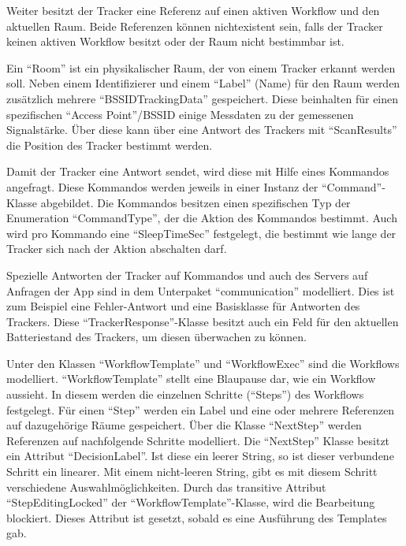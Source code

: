 Weiter besitzt der Tracker eine Referenz auf einen aktiven Workflow und den aktuellen Raum.
Beide Referenzen können nichtexistent sein, falls der Tracker keinen aktiven Workflow besitzt oder der Raum nicht bestimmbar ist.

Ein \enquote{Room} ist ein physikalischer Raum, der von einem Tracker erkannt werden soll.
Neben einem Identifizierer und einem \enquote{Label} (Name) für den Raum werden zusätzlich mehrere \enquote{BSSIDTrackingData} gespeichert.
Diese beinhalten für einen spezifischen \enquote{Access Point}/\gls{BSSID} einige Messdaten zu der gemessenen Signalstärke.
Über diese kann über eine Antwort des Trackers mit \enquote{ScanResults} die Position des Tracker bestimmt werden.

Damit der Tracker eine Antwort sendet, wird diese mit Hilfe eines Kommandos angefragt.
Diese Kommandos werden jeweils in einer Instanz der \enquote{Command}-Klasse abgebildet.
Die Kommandos besitzen einen spezifischen Typ der Enumeration \enquote{CommandType}, der die Aktion des Kommandos bestimmt.
Auch wird pro Kommando eine \enquote{SleepTimeSec} festgelegt, die bestimmt wie lange der Tracker sich nach der Aktion abschalten darf.

Spezielle Antworten der Tracker auf Kommandos und auch des Servers auf Anfragen der App sind in dem Unterpaket \enquote{communication} modelliert.
Dies ist zum Beispiel eine Fehler-Antwort und eine Basisklasse für Antworten des Trackers.
Diese \enquote{TrackerResponse}-Klasse besitzt auch ein Feld für den aktuellen Batteriestand des Trackers, um diesen überwachen zu können.

Unter den Klassen \enquote{WorkflowTemplate} und \enquote{WorkflowExec} sind die Workflows modelliert.
\enquote{WorkflowTemplate} stellt eine Blaupause dar, wie ein Workflow aussieht.
In diesem werden die einzelnen Schritte (\enquote{Steps}) des Workflows festgelegt.
Für einen \enquote{Step} werden ein Label und eine oder mehrere Referenzen auf dazugehörige Räume gespeichert.
Über die Klasse \enquote{NextStep} werden Referenzen auf nachfolgende Schritte modelliert.
Die \enquote{NextStep} Klasse besitzt ein Attribut \enquote{DecisionLabel}.
Ist diese ein leerer String, so ist dieser verbundene Schritt ein linearer.
Mit einem nicht-leeren String, gibt es mit diesem Schritt verschiedene Auswahlmöglichkeiten.
Durch das transitive Attribut \enquote{StepEditingLocked} der \enquote{WorkflowTemplate}-Klasse, wird die Bearbeitung blockiert.
Dieses Attribut ist gesetzt, sobald es eine Ausführung des Templates gab.

